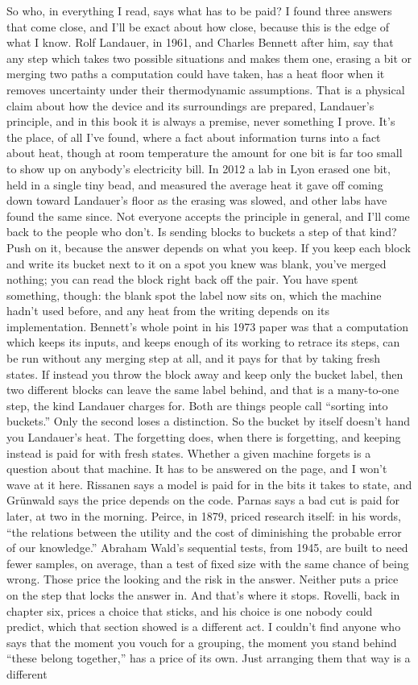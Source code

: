 \documentclass[11pt,twoside]{article}
\theoremstyle{thielethm}
\theoremstyle{thieledef}
\theoremstyle{thieledef}
\theoremstyle{thieledef}
\theoremstyle{thielethm}
\theoremstyle{thieleobs}
\theoremstyle{thielethm}
\begin{document}
So who, in everything I read, says what has to be paid? I found three answers that come close, and I'll be exact about how close, because this is the edge of what I know. Rolf Landauer, in 1961, and Charles Bennett after him, say that any step which takes two possible situations and makes them one, erasing a bit or merging two paths a computation could have taken, has a heat floor when it removes uncertainty under their thermodynamic assumptions. That is a physical claim about how the device and its surroundings are prepared, Landauer's principle, and in this book it is always a premise, never something I prove. It's the place, of all I've found, where a fact about information turns into a fact about heat, though at room temperature the amount for one bit is far too small to show up on anybody's electricity bill. In 2012 a lab in Lyon erased one bit, held in a single tiny bead, and measured the average heat it gave off coming down toward Landauer's floor as the erasing was slowed, and other labs have found the same since. Not everyone accepts the principle in general, and I'll come back to the people who don't. Is sending blocks to buckets a step of that kind? Push on it, because the answer depends on what you keep. If you keep each block and write its bucket next to it on a spot you knew was blank, you've merged nothing; you can read the block right back off the pair. You have spent something, though: the blank spot the label now sits on, which the machine hadn't used before, and any heat from the writing depends on its implementation. Bennett's whole point in his 1973 paper was that a computation which keeps its inputs, and keeps enough of its working to retrace its steps, can be run without any merging step at all, and it pays for that by taking fresh states. If instead you throw the block away and keep only the bucket label, then two different blocks can leave the same label behind, and that is a many-to-one step, the kind Landauer charges for. Both are things people call ``sorting into buckets.'' Only the second loses a distinction. So the bucket by itself doesn't hand you Landauer's heat. The forgetting does, when there is forgetting, and keeping instead is paid for with fresh states. Whether a given machine forgets is a question about that machine. It has to be answered on the page, and I won't wave at it here. Rissanen says a model is paid for in the bits it takes to state, and Grünwald says the price depends on the code. Parnas says a bad cut is paid for later, at two in the morning. Peirce, in 1879, priced research itself: in his words, ``the relations between the utility and the cost of diminishing the probable error of our knowledge.'' Abraham Wald's sequential tests, from 1945, are built to need fewer samples, on average, than a test of fixed size with the same chance of being wrong. Those price the looking and the risk in the answer. Neither puts a price on the step that locks the answer in. And that's where it stops. Rovelli, back in chapter six, prices a choice that sticks, and his choice is one nobody could predict, which that section showed is a different act. I couldn't find anyone who says that the moment you vouch for a grouping, the moment you stand behind ``these belong together,'' has a price of its own. Just arranging them that way is a different 
\end{document}
